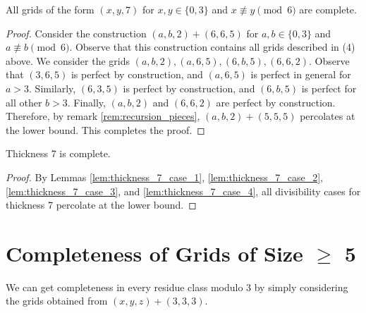 \begin{lem}
\label{lem:thickness_7_case_4}
All grids of the form $(x,y,7)$ for $x,y \in \{0,3\}$ and $x \not\equiv y \pmod 6$ are complete.
\end{lem}

\begin{proof}
Consider the construction $(a,b,2) + (6,6,5)$ for $a,b \in \{0,3\}$ and $a \not\equiv b \pmod 6$. Observe that this construction contains all grids described in (4) above. We consider the grids $(a,b,2), (a,6,5), (6,b,5), (6,6,2)$. Observe that $(3,6,5)$ is perfect by construction, and $(a,6,5)$ is perfect in general for $a>3$. Similarly, $(6,3,5)$ is perfect by construction, and $(6,b,5)$ is perfect for all other $b>3$. Finally, $(a,b,2)$ and $(6,6,2)$ are perfect by construction. Therefore, by remark \ref{rem:recursion_pieces}, $(a,b,2) + (5,5,5)$ percolates at the lower bound. This completes the proof.
\end{proof}

\begin{lem}
Thickness 7 is complete.
\end{lem}

\begin{proof}
By Lemmas \ref{lem:thickness_7_case_1}, \ref{lem:thickness_7_case_2}, \ref{lem:thickness_7_case_3}, and \ref{lem:thickness_7_case_4}, all divisibility cases for thickness 7 percolate at the lower bound.
\end{proof}

\section{Completeness of Grids of Size $\geq$ 5}

We can get completeness in every residue class modulo 3 by simply considering the grids obtained from $(x,y,z)+(3,3,3)$.




